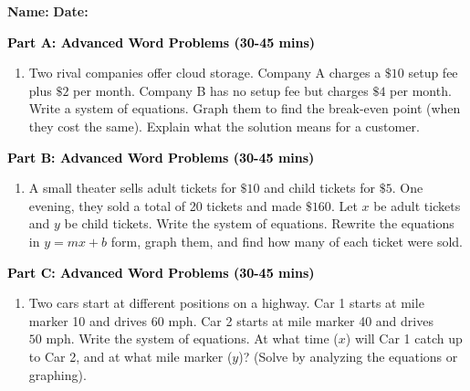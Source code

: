 \documentclass[12pt, letterpaper, fleqn]{article}
\begin{document}
\textbf{Name:} \underline{\hspace{5cm}}
\hfill
\textbf{Date:} \underline{\hspace{3cm}}\\


\begin{tcolorbox}[colback=customteal!20]
\large\textcolor{black}{\textbf{Part A: Advanced Word Problems (30-45 mins)}}
\end{tcolorbox}

\vspace{3mm}

\begin{enumerate}[itemsep=5.5cm, leftmargin=0.6cm]
\item Two rival companies offer cloud storage. Company A charges a $\$10$ setup fee plus $\$2$ per month. Company B has no setup fee but charges $\$4$ per month. Write a system of equations. Graph them to find the break-even point (when they cost the same). Explain what the solution means for a customer.
\end{enumerate}

\newpage

\begin{tcolorbox}[colback=customteal!20]
\large\textcolor{black}{\textbf{Part B: Advanced Word Problems (30-45 mins)}}
\end{tcolorbox}

\vspace{3mm}

\begin{enumerate}[itemsep=5.5cm, leftmargin=0.6cm, resume]
\item A small theater sells adult tickets for $\$10$ and child tickets for $\$5$. One evening, they sold a total of 20 tickets and made $\$160$. Let $x$ be adult tickets and $y$ be child tickets. Write the system of equations. Rewrite the equations in $y=mx+b$ form, graph them, and find how many of each ticket were sold.
\end{enumerate}

\newpage

\begin{tcolorbox}[colback=customteal!20]
\large\textcolor{black}{\textbf{Part C: Advanced Word Problems (30-45 mins)}}
\end{tcolorbox}

\vspace{3mm}

\begin{enumerate}[itemsep=5.5cm, leftmargin=0.6cm, resume]
\item Two cars start at different positions on a highway. Car 1 starts at mile marker 10 and drives $60\text{ mph}$. Car 2 starts at mile marker 40 and drives $50\text{ mph}$. Write the system of equations. At what time ($x$) will Car 1 catch up to Car 2, and at what mile marker ($y$)? (Solve by analyzing the equations or graphing).
\end{enumerate}
\end{document}
